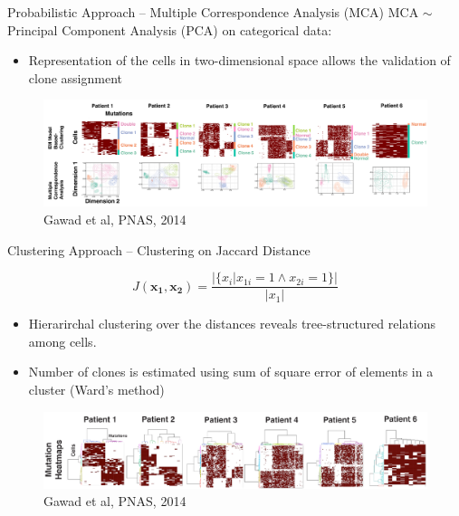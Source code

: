 \documentclass[pdf, aspectratio=169]{beamer}
\begin{document}
\begin{frame}{Probabilistic Approach -- Multiple Correspondence Analysis (MCA)}
	MCA $\sim$ Principal Component Analysis (PCA) on categorical data:
	
	\begin{itemize}
		\item Representation of the cells in two-dimensional space allows the validation of clone assignment
	\end{itemize}
	
	\begin{figure}
		\center
		\includegraphics[scale=.3]{06.png}
		{\tiny Gawad et al, PNAS, 2014}
	\end{figure}
\end{frame}

\begin{frame}{Clustering Approach -- Clustering on Jaccard Distance}

		$$J(\mathbf{x_1}, \mathbf{x_2}) = \frac{|\{x_i | x_{1i} = 1 \wedge x_{2i} = 1 \}|}{|x_1|}$$
	
	\begin{itemize}
		\item Hierarirchal clustering over the distances reveals tree-structured relations among cells.
		\item Number of clones is estimated using sum of square error of elements in a cluster (Ward's method)
	\end{itemize}
	
	\begin{figure}
		\center
		\includegraphics[scale=.2]{07.png}
		{\tiny Gawad et al, PNAS, 2014}
	\end{figure}
\end{frame}
\end{document}

